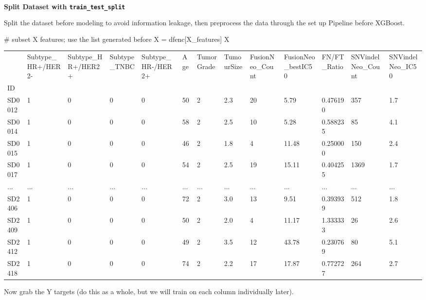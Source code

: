 \documentclass[
  letterpaper,
  DIV=11,
  numbers=noendperiod]{scrartcl}
\makeatletter
\let\oldparagraph\paragraph
\renewcommand{\paragraph}{
    \@ifstar
      \xxxParagraphStar
      \xxxParagraphNoStar
  }
\newcommand{\xxxParagraphStar}[1]{\oldparagraph*{#1}\mbox{}}
\newcommand{\xxxParagraphNoStar}[1]{\oldparagraph{#1}\mbox{}}
\newenvironment{Shaded}{\begin{snugshade}}{\end{snugshade}}
\newcommand{\CommentTok}[1]{\textcolor[rgb]{0.37,0.37,0.37}{#1}}
\newcommand{\NormalTok}[1]{\textcolor[rgb]{0.00,0.23,0.31}{#1}}
\newcommand{\OperatorTok}[1]{\textcolor[rgb]{0.37,0.37,0.37}{#1}}
\makeatother
\begin{document}
\paragraph{\texorpdfstring{\textbf{Split Dataset with
\texttt{train\_test\_split}}}{Split Dataset with train\_test\_split}}\label{split-dataset-with-train_test_split}

Split the dataset before modeling to avoid information leakage, then
preprocess the data through the set up Pipeline before XGBoost.

\begin{Shaded}
\begin{Highlighting}[]
\CommentTok{\# subset X features; use the list generated before}
\NormalTok{X }\OperatorTok{=}\NormalTok{ dfenc[X\_features]}
\NormalTok{X}
\end{Highlighting}
\end{Shaded}

\begin{longtable}[]{@{}lllllllllllll@{}}
\toprule\noalign{}
& Subtype\_HR+/HER2- & Subtype\_HR+/HER2+ & Subtype\_TNBC &
Subtype\_HR-/HER2+ & Age & TumorGrade & TumourSize & FusionNeo\_Count &
FusionNeo\_bestIC50 & FN/FT\_Ratio & SNVindelNeo\_Count &
SNVindelNeo\_IC50 \\
ID & & & & & & & & & & & & \\
\midrule\noalign{}
\endhead
\bottomrule\noalign{}
\endlastfoot
SD0012 & 1 & 0 & 0 & 0 & 50 & 2 & 2.3 & 20 & 5.79 & 0.476190 & 357 &
1.7 \\
SD0014 & 1 & 0 & 0 & 0 & 58 & 2 & 2.5 & 10 & 5.28 & 0.588235 & 85 &
4.1 \\
SD0015 & 1 & 0 & 0 & 0 & 46 & 2 & 1.8 & 4 & 11.48 & 0.250000 & 150 &
2.4 \\
SD0017 & 1 & 0 & 0 & 0 & 54 & 2 & 2.5 & 19 & 15.11 & 0.404255 & 1369 &
1.7 \\
... & ... & ... & ... & ... & ... & ... & ... & ... & ... & ... & ... &
... \\
SD2406 & 1 & 0 & 0 & 0 & 72 & 2 & 3.0 & 13 & 9.51 & 0.393939 & 512 &
1.8 \\
SD2409 & 1 & 0 & 0 & 0 & 50 & 2 & 2.0 & 4 & 11.17 & 1.333333 & 26 &
2.6 \\
SD2412 & 1 & 0 & 0 & 0 & 49 & 2 & 3.5 & 12 & 43.78 & 0.230769 & 80 &
5.1 \\
SD2418 & 1 & 0 & 0 & 0 & 74 & 2 & 2.2 & 17 & 17.87 & 0.772727 & 264 &
2.7 \\
\end{longtable}

Now grab the Y targets (do this as a whole, but we will train on each
column individually later).
\end{document}
